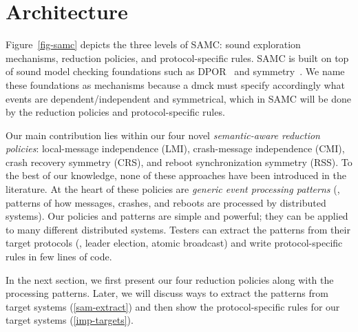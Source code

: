 


\section{Architecture}
\label{sam-arch}





Figure~\ref{fig-samc} depicts the three levels of SAMC: sound
exploration mechanisms, reduction policies, and protocol-specific
rules.  SAMC is built on top of sound model checking foundations such
as DPOR~\cite{Flanagan+05-Dpor, Godefroid+96-Dpor} and
symmetry~\cite{Clarke+98-SymReduct, Prasad+00-SymBasedMc}.  We name
these foundations as mechanisms because a dmck must specify
accordingly what events are dependent/independent and symmetrical,
which in SAMC will be done by the reduction policies and
protocol-specific rules.


Our main contribution lies within our four novel {\em semantic-aware
  reduction policies}: local-message independence (LMI), crash-message
independence (CMI), crash recovery symmetry (CRS), and reboot
synchronization symmetry (RSS).  To the best of our knowledge, none of
these approaches have been introduced in the literature.  At the heart
of these policies are {\em generic event processing patterns} (\ie,
patterns of how messages, crashes, and reboots are processed by
distributed systems).  Our policies and patterns are simple and
powerful; they can be applied to many different distributed systems.  Testers
can extract the patterns from their target protocols (\eg,
leader election, atomic broadcast) and write protocol-specific
rules in few lines of code.

In the next section, we first present our four reduction policies
along with the processing patterns.  Later, we will discuss ways to
extract the patterns from target systems (\sec\ref{sam-extract}) and
then show the protocol-specific rules for our target systems
(\sec\ref{imp-targets}).


